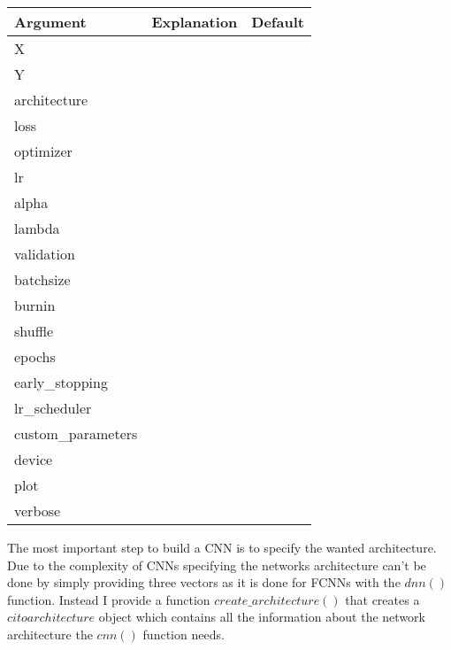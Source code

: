\documentclass{article}
\begin{document}
\begin{table}[]
	\begin{tabular}{|lll|}
		\hline
		Argument           & Explanation & Default \\
		\hline
		X                  &             &         \\
		Y                  &             &         \\
		architecture       &             &         \\
		loss               &             &         \\
		optimizer          &             &         \\
		lr                 &             &         \\
		alpha              &             &         \\
		lambda             &             &         \\
		validation         &             &         \\
		batchsize          &             &         \\
		burnin             &             &         \\
		shuffle            &             &         \\
		epochs             &             &         \\
		early\_stopping    &             &         \\
		lr\_scheduler      &             &         \\
		custom\_parameters &             &         \\
		device             &             &         \\
		plot               &             &         \\
		verbose            &             &         \\
		\hline
	\end{tabular}
	\caption{}
\end{table}
The most important step to build a \ac{CNN} is to specify the wanted architecture. Due to the complexity of \acp{CNN} specifying the networks architecture can't be done by simply providing three vectors as it is done for \acp{FCNN} with the $dnn()$ function. Instead I provide a function $create\_architecture()$ that creates a $citoarchitecture$ object which contains all the information about the network architecture the $cnn()$ function needs.
\end{document}
